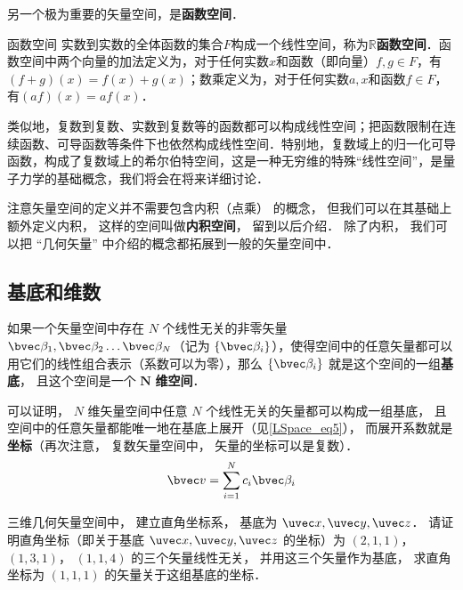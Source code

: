 另一个极为重要的矢量空间，是\textbf{函数空间}．

\begin{example}{函数空间}
实数到实数的全体函数的集合$F$构成一个线性空间，称为$\mathbb{R}$\textbf{函数空间}．函数空间中两个向量的加法定义为，对于任何实数$x$和函数（即向量）$f, g\in F$，有$(f+g)(x)=f(x)+g(x)$；数乘定义为，对于任何实数$a, x$和函数$f\in F$，有$(af)(x)=af(x)$．

类似地，复数到复数、实数到复数等的函数都可以构成线性空间；把函数限制在连续函数、可导函数等条件下也依然构成线性空间．特别地，复数域上的归一化可导函数，构成了复数域上的希尔伯特空间，这是一种无穷维的特殊“线性空间”，是量子力学的基础概念，我们将会在将来详细讨论．
\end{example}

注意矢量空间的定义并不需要包含内积（点乘） 的概念， 但我们可以在其基础上额外定义内积， 这样的空间叫做\textbf{内积空间}， 留到以后介绍． 除了内积， 我们可以把 “几何矢量” 中介绍的概念都拓展到一般的矢量空间中．



\subsection{基底和维数}

如果一个矢量空间中存在 $N$ 个线性无关的非零矢量 $\bvec \beta_1, \bvec \beta_2 \dots \bvec \beta_N$（记为 $\{\bvec \beta_i\}$），使得空间中的任意矢量都可以用它们的线性组合表示（系数可以为零），那么 $\{\bvec \beta_i\}$ 就是这个空间的一组\textbf{基底}， 且这个空间是一个 $\boldsymbol{N}$ \textbf{维空间}．

可以证明， $N$ 维矢量空间中任意 $N$ 个线性无关的矢量都可以构成一组基底， 且空间中的任意矢量都能唯一地在基底上展开（见\autoref{LSpace_eq5}）， 而展开系数就是\textbf{坐标}（再次注意， 复数矢量空间中， 矢量的坐标可以是复数）．
\begin{equation}
\bvec v = \sum_{i=1}^N c_i \bvec \beta_i
\end{equation}

\begin{exercise}{}
三维几何矢量空间中， 建立直角坐标系， 基底为 $\uvec x, \uvec y, \uvec z$． 请证明直角坐标（即关于基底 $\uvec x, \uvec y, \uvec z$ 的坐标）为 $(2, 1, 1)$， $(1, 3, 1)$， $(1, 1, 4)$ 的三个矢量线性无关， 并用这三个矢量作为基底， 求直角坐标为 $(1, 1, 1)$ 的矢量关于这组基底的坐标．
\end{exercise}

